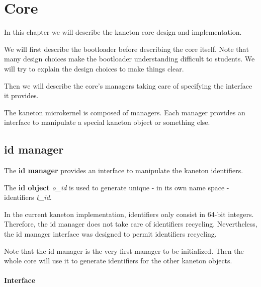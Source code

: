 
%
%

\chapter{Core}

In this chapter we will describe the kaneton core design and implementation.

We will first describe the bootloader before describing the core itself.
Note that many design choices make the bootloader understanding difficult
to students. We will try to explain the design choices to make things
clear.

Then we will describe the core's managers taking care of specifying the
interface it provides.

\newpage

%
%

The kaneton microkernel is composed of managers. Each manager provides
an interface to manipulate a special kaneton object or something else.

%
%

\section{id manager}

The \textbf{id manager} provides an interface to manipulate the
kaneton identifiers.

The \textbf{id object} \textit{o\_id} is used to generate unique
- in its own name space - identifiers \textit{t\_id}.

In the current kaneton implementation, identifiers only consist in 64-bit
integers. Therefore, the id manager does not take care of identifiers
recycling. Nevertheless, the id manager interface was designed to permit
identifiers recycling.

Note that the id manager is the very first manager to be initialized. Then
the whole core will use it to generate identifiers for the other kaneton
objects.

%
%

\subsubsection{Interface}

